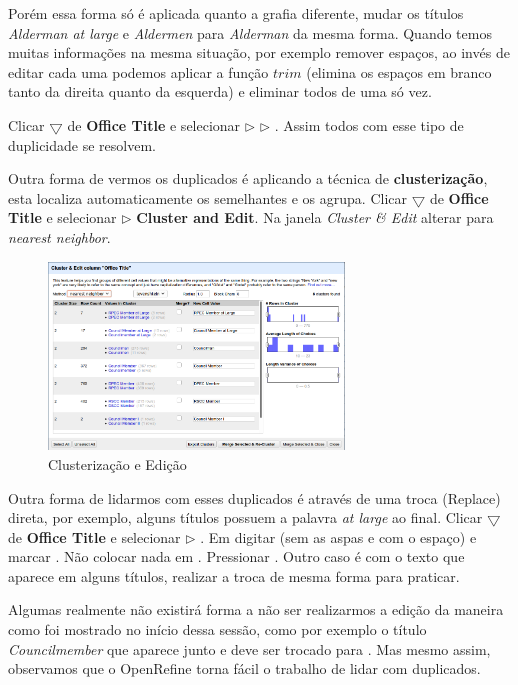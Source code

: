 \documentclass[a4paper,11pt]{article}
\begin{document}
Porém essa forma só é aplicada quanto a grafia diferente, mudar os títulos \textit{Alderman at large} e \textit{Aldermen} para \textit{Alderman} da mesma forma. Quando temos muitas informações na mesma situação, por exemplo remover espaços, ao invés de editar cada uma podemos aplicar a função $trim$ (elimina os espaços em branco tanto da direita quanto da esquerda) e eliminar todos de uma só vez.

Clicar $\bigtriangledown$ de \textbf{Office Title} e selecionar  $\triangleright$  $\triangleright$ . Assim todos com esse tipo de duplicidade se resolvem.

Outra forma de vermos os duplicados é aplicando a técnica de \textbf{clusterização}, esta localiza automaticamente os semelhantes e os agrupa. Clicar $\bigtriangledown$ de \textbf{Office Title} e selecionar  $\triangleright$ \textbf{Cluster and Edit}. Na janela \textit{Cluster \& Edit} alterar  para \textit{nearest neighbor}.
\begin{figure}[H]
	\centering
	\includegraphics[width=0.7\textwidth]{imagem/cluster.png}
	\caption{Clusterização e Edição}
\end{figure}

Outra forma de lidarmos com esses duplicados é através de uma troca (Replace) direta, por exemplo, alguns títulos possuem a palavra \textit{at large} ao final. Clicar $\bigtriangledown$ de \textbf{Office Title} e selecionar  $\triangleright$ . Em  digitar  (sem as aspas e com o espaço) e marcar . Não colocar nada em . Pressionar . Outro caso é com o texto  que aparece em alguns títulos, realizar a troca de mesma forma para praticar.

Algumas realmente não existirá forma a não ser realizarmos a edição da maneira como foi mostrado no início dessa sessão, como por exemplo o título \textit{Councilmember} que aparece junto e deve ser trocado para . Mas mesmo assim, observamos que o OpenRefine torna fácil o trabalho de lidar com duplicados.
\end{document}
